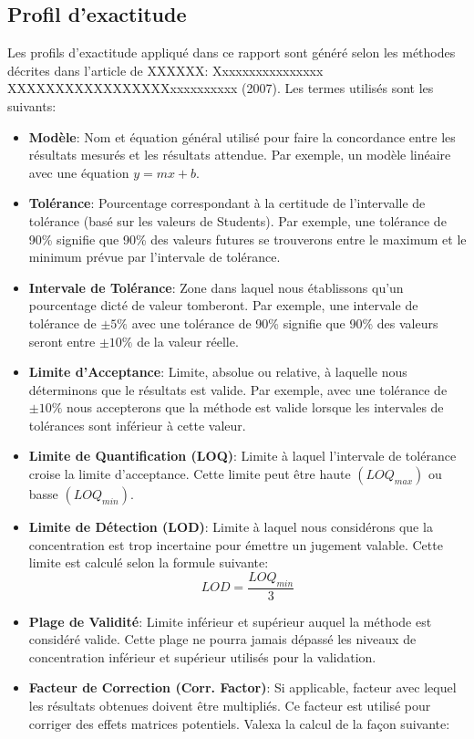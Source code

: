 \documentclass[letterpaper]{article}
\begin{document}
\subsection{Profil d'exactitude}
Les profils d'exactitude appliqué dans ce rapport sont généré selon les méthodes décrites dans l'article de XXXXXX: Xxxxxxxxxxxxxxxx XXXXXXXXXXXXXXXXXxxxxxxxxxx (2007). Les termes utilisés sont les suivants:
\begin{itemize}
    \item \textbf{Modèle}: Nom et équation général utilisé pour faire la concordance entre les résultats mesurés et les résultats attendue. Par exemple, un modèle linéaire avec une équation \( y = mx + b \).
    \item \textbf{Tolérance}: Pourcentage correspondant à la certitude de l'intervalle de tolérance (basé sur les valeurs de Students). Par exemple, une tolérance de 90\% signifie que 90\% des valeurs futures se trouverons entre le maximum et le minimum prévue par l'intervale de tolérance.
    \item \textbf{Intervale de Tolérance}: Zone dans laquel nous établissons qu'un pourcentage dicté de valeur tomberont. Par exemple, une intervale de tolérance de \(\pm5\%\) avec une tolérance de 90\% signifie que 90\% des valeurs seront entre \(\pm10\%\) de la valeur réelle.
    \item \textbf{Limite d'Acceptance}: Limite, absolue ou relative, à laquelle nous déterminons que le résultats est valide. Par exemple, avec une tolérance de \(\pm10\%\) nous accepterons que la méthode est valide lorsque les intervales de tolérances sont inférieur à cette valeur.
    \item \textbf{Limite de Quantification (LOQ)}: Limite à laquel l'intervale de tolérance croise la limite d'acceptance. Cette limite peut être haute \((LOQ_{max})\) ou basse \((LOQ_{min})\).
    \item \textbf{Limite de Détection (LOD)}: Limite à laquel nous considérons que la concentration est trop incertaine pour émettre un jugement valable. Cette limite est calculé selon la formule suivante:
    \[ LOD = \frac{LOQ_{min}}{3} \]
    \item \textbf{Plage de Validité}: Limite inférieur et supérieur auquel la méthode est considéré valide. Cette plage ne pourra jamais dépassé les niveaux de concentration inférieur et supérieur utilisés pour la validation.
    \item \textbf{Facteur de Correction (Corr. Factor)}: Si applicable, facteur avec lequel les résultats obtenues doivent être multipliés. Ce facteur est utilisé pour corriger des effets matrices potentiels. Valexa la calcul de la façon suivante:

\end{itemize}
\end{document}
